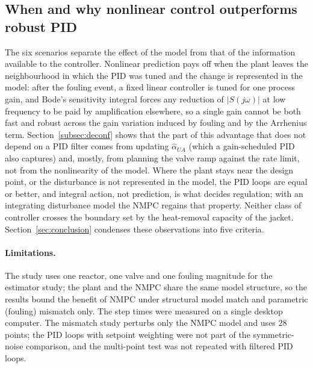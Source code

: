 

\subsection{When and why nonlinear control outperforms robust PID}
\label{subsec:when_why}
The six scenarios separate the effect of the model from that of the information available to the controller. Nonlinear prediction pays off when the plant leaves the neighbourhood in which the PID was tuned and the change is represented in the model: after the fouling event, a fixed linear controller is tuned for one process gain, and Bode's sensitivity integral \cite{stein2003respect} forces any reduction of $|S(j\omega)|$ at low frequency to be paid by amplification elsewhere, so a single gain cannot be both fast and robust across the gain variation induced by fouling and by the Arrhenius term. Section~\ref{subsec:deconf} shows that the part of this advantage that does not depend on a PID filter comes from updating $\hat\alpha_{UA}$ (which a gain-scheduled PID also captures) and, mostly, from planning the valve ramp against the rate limit, not from the nonlinearity of the model. Where the plant stays near the design point, or the disturbance is not represented in the model, the PID loops are equal or better, and integral action, not prediction, is what decides regulation; with an integrating disturbance model the NMPC regains that property. Neither class of controller crosses the boundary set by the heat-removal capacity of the jacket. Section~\ref{sec:conclusion} condenses these observations into five criteria.

\paragraph{Limitations.} The study uses one reactor, one valve and one fouling magnitude for the estimator study; the plant and the NMPC share the same model structure, so the results bound the benefit of NMPC under structural model match and parametric (fouling) mismatch only. The step times were measured on a single desktop computer. The mismatch study perturbs only the NMPC model and uses $28$ points; the PID loops with setpoint weighting were not part of the symmetric-noise comparison, and the multi-point test was not repeated with filtered PID loops.
